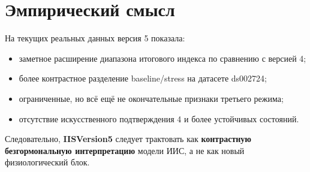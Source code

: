 \documentclass[12pt,a4paper]{article}
\begin{document}
\section{Эмпирический смысл}
На текущих реальных данных версия 5 показала:
\begin{itemize}[leftmargin=1.25cm]
    \item заметное расширение диапазона итогового индекса по сравнению с версией 4;
    \item более контрастное разделение baseline/stress на датасете ds002724;
    \item ограниченные, но всё ещё не окончательные признаки третьего режима;
    \item отсутствие искусственного подтверждения 4 и более устойчивых состояний.
\end{itemize}

Следовательно, \textbf{IISVersion5} следует трактовать как \textbf{контрастную безгормональную интерпретацию} модели ИИС, а не как новый физиологический блок.
\end{document}
